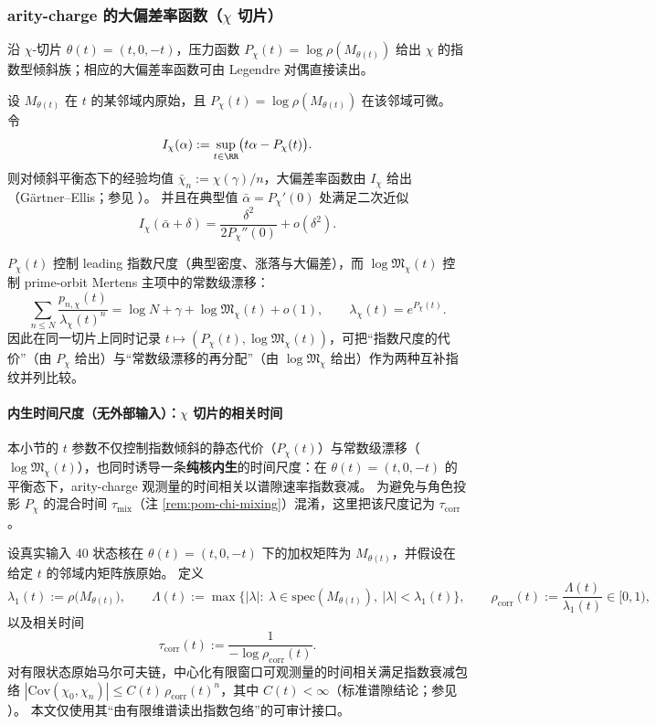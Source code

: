 \subsubsection{arity-charge 的大偏差率函数（\texorpdfstring{$\chi$}{chi} 切片）}\label{subsec:chi-ldp}
沿 $\chi$-切片 $\theta(t)=(t,0,-t)$，压力函数 $P_\chi(t)=\log\rho(M_{\theta(t)})$ 给出 $\chi$ 的指数型倾斜族；相应的大偏差率函数可由 Legendre 对偶直接读出。

\begin{remark}\label{thm:chi-gartner-ellis}
设 $M_{\theta(t)}$ 在 $t$ 的某邻域内原始，且 $P_\chi(t)=\log\rho(M_{\theta(t)})$ 在该邻域可微。
令
\[
I_\chi(\alpha):=\sup_{t\in\RR}\bigl(t\alpha-P_\chi(t)\bigr).
\]
则对倾斜平衡态下的经验均值 $\bar\chi_n:=\chi(\gamma)/n$，大偏差率函数由 $I_\chi$ 给出（Gärtner--Ellis；参见 \cite{DemboZeitouni2010LargeDeviations}）。
并且在典型值 $\bar\alpha=P_\chi'(0)$ 处满足二次近似
\[
I_\chi(\bar\alpha+\delta)=\frac{\delta^2}{2P_\chi''(0)}+o(\delta^2).
\]
\end{remark}

\begin{remark}
$P_\chi(t)$ 控制 leading 指数尺度（典型密度、涨落与大偏差），而 $\log\mathfrak{M}_\chi(t)$ 控制 prime-orbit Mertens 主项中的常数级漂移：
\[
\sum_{n\le N}\frac{p_{n,\chi}(t)}{\lambda_\chi(t)^n}=\log N+\gamma+\log\mathfrak{M}_\chi(t)+o(1),
\qquad
\lambda_\chi(t)=e^{P_\chi(t)}.
\]
因此在同一切片上同时记录 $t\mapsto(P_\chi(t),\log\mathfrak{M}_\chi(t))$，可把“指数尺度的代价”（由 $P_\chi$ 给出）与“常数级漂移的再分配”（由 $\log\mathfrak{M}_\chi$ 给出）作为两种互补指纹并列比较。
\end{remark}

\paragraph{内生时间尺度（无外部输入）：\texorpdfstring{$\chi$}{chi} 切片的相关时间}
本小节的 $t$ 参数不仅控制指数倾斜的静态代价（$P_\chi(t)$）与常数级漂移（$\log\mathfrak{M}_\chi(t)$），也同时诱导一条\textbf{纯核内生}的时间尺度：在 $\theta(t)=(t,0,-t)$ 的平衡态下，arity-charge 观测量的时间相关以谱隙速率指数衰减。
为避免与角色投影 $P_\chi$ 的混合时间 $\tau_{\mathrm{mix}}$（注 \ref{rem:pom-chi-mixing}）混淆，这里把该尺度记为 $\tau_{\mathrm{corr}}$。

\begin{remark}\label{prop:chi-slice-time-correlation}
设真实输入 40 状态核在 $\theta(t)=(t,0,-t)$ 下的加权矩阵为 $M_{\theta(t)}$，并假设在给定 $t$ 的邻域内矩阵族原始。
定义
\[
\lambda_1(t):=\rho\bigl(M_{\theta(t)}\bigr),
\qquad
\Lambda(t):=\max\{ |\lambda|:\ \lambda\in\mathrm{spec}(M_{\theta(t)}),\ |\lambda|<\lambda_1(t)\},
\qquad
\rho_{\mathrm{corr}}(t):=\frac{\Lambda(t)}{\lambda_1(t)}\in[0,1),
\]
以及相关时间
\[
\tau_{\mathrm{corr}}(t):=\frac{1}{-\log \rho_{\mathrm{corr}}(t)}.
\]
对有限状态原始马尔可夫链，中心化有限窗口可观测量的时间相关满足指数衰减包络
\(
|\mathrm{Cov}(\chi_0,\chi_n)|\le C(t)\,\rho_{\mathrm{corr}}(t)^n
\)，其中 $C(t)<\infty$（标准谱隙结论；参见 \cite{LevinPeresWilmer2009MarkovMixing}）。
本文仅使用其“由有限维谱读出指数包络”的可审计接口。
\end{remark}

